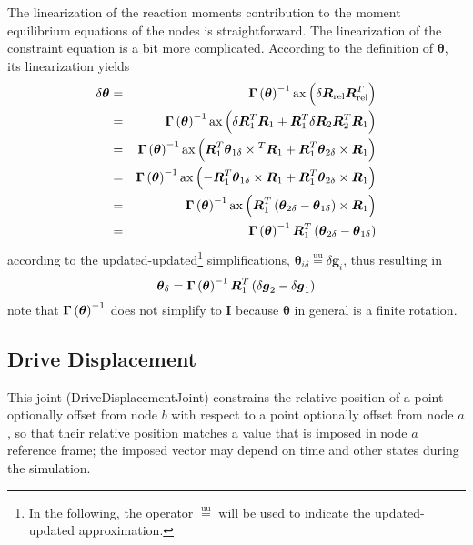 \documentclass[10pt,dvips,fleqn,subeqn]{report}
\newcommand{\T}[1]{\boldsymbol{#1}}
\newcommand{\equu}{\overset{\text{uu}}{=}}
\begin{document}
The linearization of the reaction moments contribution 
to the moment equilibrium equations of the nodes is straightforward.
The linearization of the constraint equation is a bit more complicated.
According to the definition of $\T{\theta}$, its linearization
yields
\begin{eqnarray*}
	\delta\T{\theta}
		& = & \T{\Gamma}\plbr{\T{\theta}}^{-1} 
			\llk{ax}\plbr{\delta\T{R}_{\text{rel}} \T{R}_{\text{rel}}^T} \\
		& = & \T{\Gamma}\plbr{\T{\theta}}^{-1} \llk{ax}\plbr{
			\delta\T{R}_1^T \T{R}_1
			+ \T{R}_1^T \delta\T{R}_2 \T{R}_2^T \T{R}_1
		} \\
		& = & \T{\Gamma}\plbr{\T{\theta}}^{-1} \llk{ax}\plbr{
			\T{R}_1^T \T{\theta}_{1\delta}\times{}^T \T{R}_1
			+ \T{R}_1^T \T{\theta}_{2\delta}\times{} \T{R}_1
		} \\
		& = & \T{\Gamma}\plbr{\T{\theta}}^{-1} \llk{ax}\plbr{
			- \T{R}_1^T \T{\theta}_{1\delta}\times{} \T{R}_1
			+ \T{R}_1^T \T{\theta}_{2\delta}\times{} \T{R}_1
		} \\
		& = & \T{\Gamma}\plbr{\T{\theta}}^{-1}
			\llk{ax} \plbr{
				\T{R}_1^T \plbr{
					\T{\theta}_{2\delta}
					- \T{\theta}_{1\delta}
				}\times \T{R}_1
			} \\
		& = & \T{\Gamma}\plbr{\T{\theta}}^{-1} \T{R}_1^T \plbr{
			\T{\theta}_{2\delta} - \T{\theta}_{1\delta}
		}
\end{eqnarray*}
according to the updated-updated\footnote{In the following, 
the operator $\equu$ will be used to indicate the updated-updated
approximation.} simplifications,
$\T{\theta}_{i\delta}\equu\delta\T{g}_i$, thus resulting in
\begin{equation}
	\T{\theta}_{\delta} = \T{\Gamma}\plbr{\T{\theta}}^{-1} \T{R}_1^T \plbr{
		\delta\T{g}_2 - \delta\T{g}_1
	}
	\label{eq:DRIVE-HINGE-theta-delta}
\end{equation}
note that $\T{\Gamma}\plbr{\T{\theta}}^{-1}$ does not simplify to $\T{I}$
because $\T{\theta}$ in general is a finite rotation.



\subsection{Drive Displacement}
\label{sec:DriveDisplacementJoint}
This joint (DriveDisplacementJoint) constrains the relative position
of a point optionally offset from node $b$ with respect to a point
optionally offset from node $a$, so that their relative position matches
a value that is imposed in node $a$ reference frame; the imposed vector
may depend on time and other states during the simulation.
\end{document}
